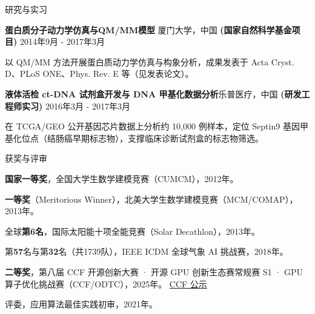 \documentclass{resume} %
\begin{document}
\begin{rSection}{研究与实习}
\begin{rSubsection}{\bf 蛋白质分子动力学仿真与QM/MM模型  }{厦门大学，中国}
{\bf (国家自然科学基金项目) }{2014年9月 - 2017年3月}
  \item {以 QM/MM 方法开展蛋白质动力学仿真与构象分析，成果发表于 Acta Cryst. D、PLoS ONE、Phys. Rev. E 等（见发表论文）。}\\
\end{rSubsection}

\begin{rSubsection}{\bf 液体活检 ct-DNA 试剂盒开发与 DNA 甲基化数据分析}{乐普医疗，中国}
{\bf (研发工程师实习) }{2016年3月 - 2017年3月}
  \item {在 TCGA/GEO 公开基因芯片数据上分析约 10,000 例样本，定位 Septin9 基因甲基化位点（结肠癌早期标志物），支撑临床诊断试剂盒的标志物筛选。}\\
\end{rSubsection}

\end{rSection}

\begin{rSection}{获奖与评审}

\begin{rSubsection}{}{}
{}{}
  \item {{\bf 国家一等奖}，全国大学生数学建模竞赛（CUMCM），2012年。}\\
  \item {{\bf 一等奖}（Meritorious Winner），北美大学生数学建模竞赛（MCM/COMAP），2013年。}\\
  \item {全球{\bf 第6名}，国际太阳能十项全能竞赛（Solar Decathlon），2013年。}\\
  \item {第{\bf 57}名与第{\bf 32}名（共1739队），IEEE ICDM 全球气象 AI 挑战赛，2018年。}\\
  \item {{\bf 二等奖}，第八届 CCF 开源创新大赛 · 开源 GPU 创新生态赛常规赛 S1 · GPU 算子优化挑战赛（CCF/ODTC），2025年。 \href{https://www.ccf.org.cn/Media_list/ccfosc/2025-12-26/855561.shtml}{\small CCF 公示}}\\
  \item {评委，应用算法最佳实践初审，2021年。}\\
\end{rSubsection}

\end{rSection}
\end{document}

